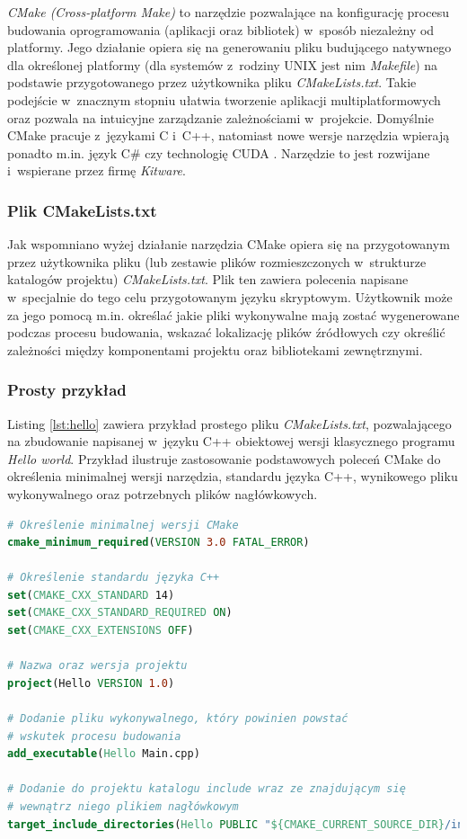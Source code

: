 \textit{CMake (Cross-platform Make)} to narzędzie pozwalające na konfigurację procesu budowania oprogramowania (aplikacji oraz bibliotek) w~sposób niezależny od platformy. Jego działanie opiera się na generowaniu pliku budującego natywnego dla określonej platformy \cite{CMakeIntro} (dla systemów z~rodziny UNIX jest nim \textit{Makefile}) na podstawie przygotowanego przez użytkownika pliku \textit{CMakeLists.txt}. Takie podejście w~znacznym stopniu ułatwia tworzenie aplikacji multiplatformowych oraz pozwala na intuicyjne zarządzanie zależnościami w~projekcie. Domyślnie CMake pracuje z~językami C i~C++, natomiast nowe wersje narzędzia wpierają ponadto m.in. język C\# czy technologię CUDA \cite{CMakeSupport}. Narzędzie to jest rozwijane i~wspierane przez firmę \textit{Kitware}.\par

\subsubsection*{Plik CMakeLists.txt}
Jak wspomniano wyżej działanie narzędzia CMake opiera się na przygotowanym przez użytkownika pliku (lub zestawie plików rozmieszczonych w~strukturze katalogów projektu) \textit{CMakeLists.txt}. Plik ten zawiera polecenia napisane w~specjalnie do tego celu przygotowanym języku skryptowym. Użytkownik może za jego pomocą  m.in. określać jakie pliki wykonywalne mają zostać wygenerowane podczas procesu budowania, wskazać lokalizację plików źródłowych czy określić zależności między komponentami projektu oraz bibliotekami zewnętrznymi. \par

\subsubsection*{Prosty przykład}
Listing \ref{lst:hello} zawiera przykład prostego pliku \textit{CMakeLists.txt}, pozwalającego na zbudowanie napisanej w~języku C++ obiektowej wersji klasycznego programu \textit{Hello world}. Przykład ilustruje zastosowanie podstawowych poleceń CMake do określenia minimalnej wersji narzędzia, standardu języka C++, wynikowego pliku wykonywalnego oraz potrzebnych plików nagłówkowych. \par

\begin{lstlisting}[language=cmake,caption={Przykład prostego pliku CMakeLists.txt przeznaczonego do budowania programu napisanego w~C++}, label={lst:hello}]
# Określenie minimalnej wersji CMake
cmake_minimum_required(VERSION 3.0 FATAL_ERROR)

# Określenie standardu języka C++
set(CMAKE_CXX_STANDARD 14)
set(CMAKE_CXX_STANDARD_REQUIRED ON)
set(CMAKE_CXX_EXTENSIONS OFF)

# Nazwa oraz wersja projektu
project(Hello VERSION 1.0)

# Dodanie pliku wykonywalnego, który powinien powstać
# wskutek procesu budowania
add_executable(Hello Main.cpp)

# Dodanie do projektu katalogu include wraz ze znajdującym się 
# wewnątrz niego plikiem nagłówkowym
target_include_directories(Hello PUBLIC "${CMAKE_CURRENT_SOURCE_DIR}/include")
\end{lstlisting}

